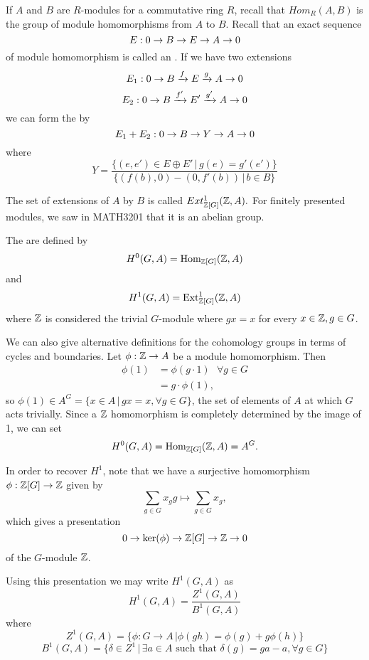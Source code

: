 \documentclass[12pt, a4paper]{report}
\begin{document}
If $A$ and $B$ are $R$-modules for a commutative ring $R$, recall that
$Hom_R(A,B)$ is the group of module homomorphisms from $A$ to $B$.
Recall that an exact sequence
\[E: 0 \rightarrow B \rightarrow E \rightarrow A \rightarrow 0\]
of module homomorphism is called an . If we have
two extensions
\[E_1: 0 \rightarrow B \xrightarrow[]{f} E \xrightarrow[]{g} A \rightarrow 0\]
\[E_2: 0 \rightarrow B \xrightarrow[]{f'} E' \xrightarrow[]{g'} A \rightarrow 0\]
we can form the  by
\[E_1 + E_2 : 0 \rightarrow B \rightarrow Y \rightarrow A \rightarrow 0\]
where
\[Y = \frac{\{(e,e') \in E \oplus E' \, | \, g(e) = g'(e')\}}{\{
    (f(b),0) - (0, f'(b)) \, | \, b \in B\}}\]

The set of extensions of $A$ by $B$ is called $Ext^1_{{\mathbb Z}[G]} ({\mathbb Z},A).$ For
finitely presented modules, we saw in MATH3201 that it is an abelian group.

\begin{defn}
  The  are defined by
  \[H^0 (G, A) = \text{Hom}_{{\mathbb Z}[G]}({\mathbb Z}, A)\] and
  \[H^1 (G, A) = \text{Ext}^1_{{\mathbb Z}[G]} ({\mathbb Z}, A)\] where ${\mathbb Z}$ is considered the
  trivial $G$-module where $g x = x$ for every $x \in {\mathbb Z}, g \in G$. 
\end{defn}

We can also give alternative definitions for the cohomology groups in terms of
cycles and boundaries.
Let $\phi : {\mathbb Z} \rightarrow A$ be a module homomorphism. Then
\[\begin{split} \phi(1) &= \phi(g \cdot 1) \,\,\,\, \forall g \in G \\
    &= g \cdot \phi(1) , \end{split}\]
so $\phi(1) \in A^G = \{x \in A \, | \, gx = x, \forall g \in G\}$, the set
of elements of $A$ at which $G$ acts trivially. Since a ${\mathbb Z}$ homomorphism is
completely determined by the image of 1, we can set
\[ H^0 (G, A) = \text{Hom}_{{\mathbb Z}[G]}({\mathbb Z}, A) = A^G .\] 

In order to recover $H^1$, note that
we have a surjective homomorphism $\phi: {\mathbb Z}[G] \rightarrow {\mathbb Z}$ given by
\[\sum\limits_{g \in G} x_gg \mapsto \sum\limits_{g \in G} x_g,\]
which gives a presentation
\[0 \rightarrow \text{ker}(\phi) \rightarrow {\mathbb Z}[G] \rightarrow {\mathbb Z} \rightarrow 0\]
of the $G$-module ${\mathbb Z}$. 

Using this presentation we may write $H^1(G,A)$ as 
\[H^1(G, A) = \frac{Z^1(G,A)}{B^1(G,A)}\]
where
\[Z^1(G,A) = \{ \phi : G \rightarrow A \, | \phi(gh) = \phi(g) + g \phi(h)\}\]
\[B^1(G,A) = \{ \delta \in Z^1 \, | \, \exists a \in A \,\,\text{such that}\,\, \delta(g)
  = ga - a , \forall g \in G\}\]
\end{document}
